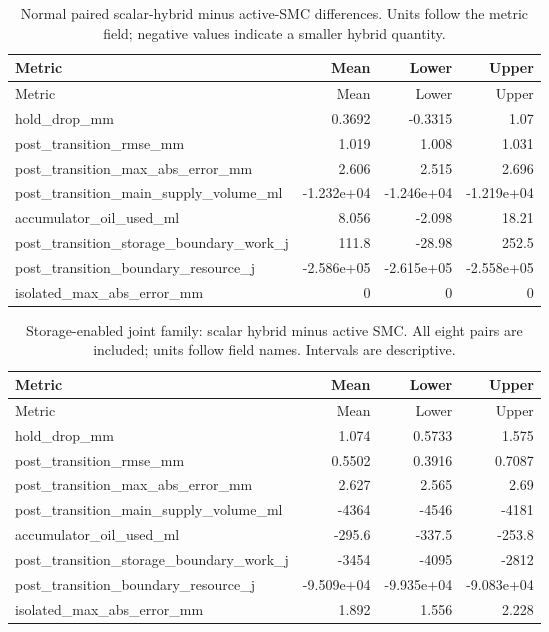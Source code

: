 \begingroup\hypersetup{hypertexnames=true}\small\setlength{\tabcolsep}{4pt}
\begin{longtable}{lrrr}
\caption{Normal paired scalar-hybrid minus active-SMC differences. Units follow the metric field; negative values indicate a smaller hybrid quantity.}\\\toprule
Metric & Mean & Lower & Upper\\\midrule\endfirsthead
\toprule
Metric & Mean & Lower & Upper\\\midrule\endhead
hold\_drop\_mm & 0.3692 & -0.3315 & 1.07\\
post\_transition\_rmse\_mm & 1.019 & 1.008 & 1.031\\
post\_transition\_max\_abs\_error\_mm & 2.606 & 2.515 & 2.696\\
post\_transition\_main\_supply\_volume\_ml & -1.232e+04 & -1.246e+04 & -1.219e+04\\
accumulator\_oil\_used\_ml & 8.056 & -2.098 & 18.21\\
post\_transition\_storage\_boundary\_work\_j & 111.8 & -28.98 & 252.5\\
post\_transition\_boundary\_resource\_j & -2.586e+05 & -2.615e+05 & -2.558e+05\\
isolated\_max\_abs\_error\_mm & 0 & 0 & 0\\
\bottomrule\end{longtable}\endgroup

\begingroup\hypersetup{hypertexnames=true}\small\setlength{\tabcolsep}{4pt}
\begin{longtable}{lrrr}
\caption{Storage-enabled joint family: scalar hybrid minus active SMC. All eight pairs are included; units follow field names. Intervals are descriptive.}\\\toprule
Metric & Mean & Lower & Upper\\\midrule\endfirsthead
\toprule
Metric & Mean & Lower & Upper\\\midrule\endhead
hold\_drop\_mm & 1.074 & 0.5733 & 1.575\\
post\_transition\_rmse\_mm & 0.5502 & 0.3916 & 0.7087\\
post\_transition\_max\_abs\_error\_mm & 2.627 & 2.565 & 2.69\\
post\_transition\_main\_supply\_volume\_ml & -4364 & -4546 & -4181\\
accumulator\_oil\_used\_ml & -295.6 & -337.5 & -253.8\\
post\_transition\_storage\_boundary\_work\_j & -3454 & -4095 & -2812\\
post\_transition\_boundary\_resource\_j & -9.509e+04 & -9.935e+04 & -9.083e+04\\
isolated\_max\_abs\_error\_mm & 1.892 & 1.556 & 2.228\\
\bottomrule\end{longtable}\endgroup

